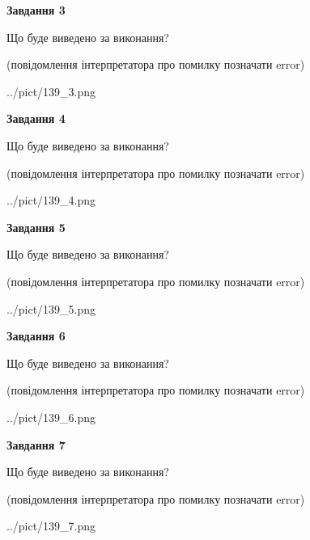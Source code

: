 \documentclass[12pt, ukrainian]{article}
\begin{document}
{\begin {large}
{\begin {center}\textbf{Завдання 3}\end {center}}\par
Що буде виведено за виконання?\par
 (повідомлення інтерпретатора про помилку позначати error)\par
\begin{center}
	{../pict/139_3.png}
\end{center}
\newpage

{\begin {center}\textbf{Завдання 4}\end {center}}\par
Що буде виведено за виконання?\par
 (повідомлення інтерпретатора про помилку позначати error)\par
\begin{center}
	{../pict/139_4.png}
\end{center}
\newpage

{\begin {center}\textbf{Завдання 5}\end {center}}\par
Що буде виведено за виконання?\par
 (повідомлення інтерпретатора про помилку позначати error)\par
\begin{center}
	{../pict/139_5.png}
\end{center}
\newpage

{\begin {center}\textbf{Завдання 6}\end {center}}\par
Що буде виведено за виконання?\par
 (повідомлення інтерпретатора про помилку позначати error)\par
\begin{center}
	{../pict/139_6.png}
\end{center}
\newpage

{\begin {center}\textbf{Завдання 7}\end {center}}\par
Що буде виведено за виконання?\par
 (повідомлення інтерпретатора про помилку позначати error)\par
\begin{center}
	{../pict/139_7.png}
\end{center}
\newpage


\end{large}}
\end{document}
